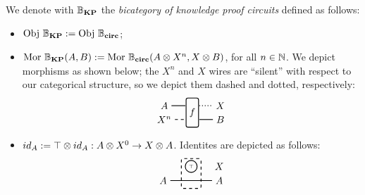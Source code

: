 \documentclass[submission,copyright,creativecommons,sharealike,noncommercial]{eptcs}
\begin{document}
\begin{definition}\label{def: definition of bkp}
  We denote with $\mathbb{B}_\textbf{KP}$ the \emph{bicategory of knowledge proof circuits} defined 
  as follows:
  \begin{itemize}
    \item $\operatorname{Obj} \, \mathbb{B}_\textbf{KP} := \operatorname{Obj} \, \mathbb{B}_\textbf{circ}$;
    \item $\operatorname{Mor} \, \mathbb{B}_\textbf{KP}(A,B) := \operatorname{Mor} \, \mathbb{B}_\textbf{circ}(A \otimes X^n, X \otimes B )$, for all $n \in \mathbb{N}$.
    We depict morphisms as shown below; the $X^n$ and $X$ wires are ``silent'' with respect to 
    our categorical structure, so we depict them dashed and dotted, respectively:
    \begin{equation*}
    \begin{tikzpicture}
      \node[draw, minimum height=30, minimum width=5, rounded corners=2, thick] (f) at (-1,0.5) {$f$};
      \node (A) at (-2,0.75) {$A$};
      \node (Xn0) at (-2,0.25) {$X^{n}$};
      \node (Bf) at (0,0.75) {$X$};
      \node (B) at (0,0.25) {$B$};

      \draw[thick] (A) -- (-1.25,0.75);
      \draw[dashed,thick] (Xn0) -- (-1.25,0.25);

      \draw[dotted,thick] (-0.75,0.75) -- (Bf);
      \draw[thick] (-0.75,0.25) -- (B);
    \end{tikzpicture}  
    \end{equation*}
    \item $id_{A} := \top \otimes id_{A}: A \otimes X^0 \to X \otimes A$. Identites are
    depicted as follows:
    \begin{equation*}
      \begin{tikzpicture}
        \node[draw, dashed, minimum height=30, minimum width=20, rounded corners=2, thick] (f) at (-1,0.5) {};
        \node[thick, draw, circle, radius=2pt, inner sep = 2pt] (true) at (-1,0.75) {\tiny{$\top$}};
        \node (A) at (-2,0.25) {$A$};
        \node (Bf) at (0,0.75) {$X$};
        \node (B) at (0,0.25) {$A$};
  
        \draw[thick] (A) -- (B);
  

\end{tikzpicture}
\end{equation*}
\end{itemize}
\end{definition}
\end{document}
